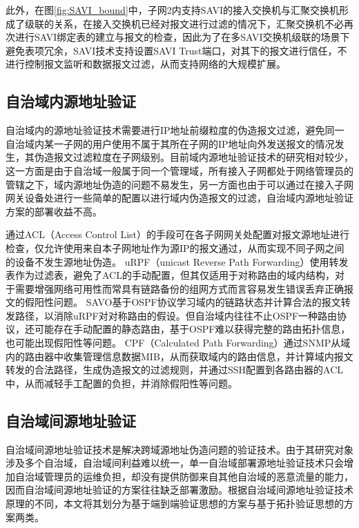       此外，在图\ref{fig:SAVI_bound}中，子网2内支持SAVI的接入交换机与汇聚交换机形成了级联的关系，在接入交换机已经对报文进行过滤的情况下，汇聚交换机不必再次进行SAVI绑定表的建立与报文的检查，因此为了在多SAVI交换机级联的场景下避免表项冗余，SAVI技术支持设置SAVI Trust端口，对其下的报文进行信任，不进行控制报文监听和数据报文过滤，从而支持网络的大规模扩展。

    \subsection{自治域内源地址验证}
    \label{survey:sava:intraas}
    自治域内的源地址验证技术需要进行IP地址前缀粒度的伪造报文过滤，避免同一自治域内某一子网的用户使用不属于其所在子网的IP地址向外发送报文的情况发生，其伪造报文过滤粒度在子网级别。目前域内源地址验证技术的研究相对较少，这一方面是由于自治域一般属于同一个管理域，所有接入子网都处于网络管理员的管辖之下，域内源地址伪造的问题不易发生，另一方面也由于可以通过在接入子网网关设备处进行一些简单的配置以进行域内伪造报文的过滤，自治域内源地址验证方案的部署收益不高。

    通过ACL（Access Control List）的手段可在各子网网关处配置对报文源地址进行检查，仅允许使用来自本子网地址作为源IP的报文通过，从而实现不同子网之间的设备不发生源地址伪造。
    uRPF（unicast Reverse Path Forwarding）\cite{uRPF}使用转发表作为过滤表，避免了ACL的手动配置，但其仅适用于对称路由的域内结构，对于需要增强网络可用性而常具有链路备份的组网方式而言容易发生错误丢弃正确报文的假阳性问题。
    SAVO\cite{I-D.tao-savi-savo}基于OSPF协议\cite{RFC2740}学习域内的链路状态并计算合法的报文转发路径，以消除uRPF对对称路由的假设。但自治域内往往不止OSPF一种路由协议，还可能存在手动配置的静态路由，基于OSPF难以获得完整的路由拓扑信息，也可能出现假阳性等问题。
    CPF（Calculated Path Forwarding）\cite{duan2006constructing}通过SNMP\cite{RFC3411,RFC3413}从域内的路由器中收集管理信息数据MIB，从而获取域内的路由信息，并计算域内报文转发的合法路径，生成伪造报文的过滤规则，并通过SSH\cite{RFC4251}配置到各路由器的ACL中，从而减轻手工配置的负担，并消除假阳性等问题。

    \subsection{自治域间源地址验证}
    \label{survey:sava:interas}
    自治域间源地址验证技术是解决跨域源地址伪造问题的验证技术。由于其研究对象涉及多个自治域，自治域间利益难以统一，单一自治域部署源地址验证技术只会增加自治域管理员的运维负担，却没有提供防御来自其他自治域的恶意流量的能力，因而自治域间源地址验证的方案往往缺乏部署激励。根据自治域间源地址验证技术原理的不同，本文将其划分为基于端到端验证思想的方案与基于拓扑验证思想的方案两类。


